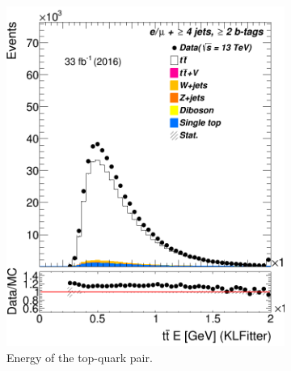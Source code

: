 \begin{figure} %
	\centering
	\begin{subfigure}{0.35\textwidth}
		\includegraphics[width=\linewidth]{ControlPlots_emujets_2016_4incl_2incl/klf_ttbar_E_emujets_2016.png}
		\caption{Energy of the top-quark pair.} \label{fig:29}
	\end{subfigure}
	\hspace*{1.5cm}
	\begin{subfigure}{0.35\textwidth}

\end{subfigure}
\end{figure}
